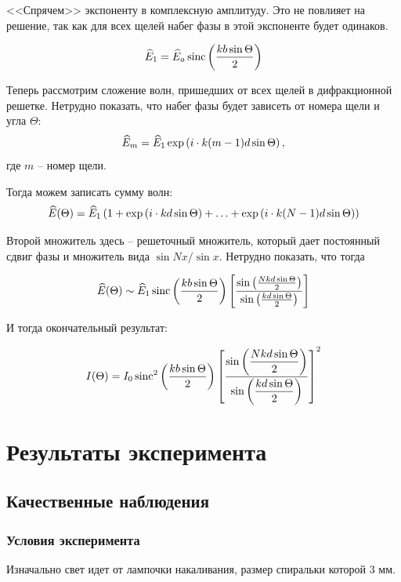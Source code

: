 <<Спрячем>> экспоненту в комплексную амплитуду. Это не повлияет на решение, так как для всех щелей набег фазы в этой экспоненте будет одинаков.

\begin{equation}
	\widehat{E}_{1}=\widehat{E}_{a}\operatorname{sinc}\left(\frac{k b \sin\Theta}{2}\right)
\end{equation}

Теперь рассмотрим сложение волн, пришедших от всех щелей в дифракционной решетке. Нетрудно показать, что набег фазы будет зависеть от номера щели и угла $\Theta$:
\begin{equation}
	\widehat{E}_m=\widehat{E}_{1}\exp\left(i\cdot k (m-1)d\sin\Theta\right),
\end{equation}
где $m$ -- номер щели.

Тогда можем записать сумму волн:
\begin{equation}
	\widehat{E}(\Theta)=\widehat{E}_1 \left(
		1+\exp\left(i\cdot kd\sin\Theta\right)+\ldots+\exp\left(i\cdot k (N-1)d\sin\Theta\right)
	\right)
\end{equation}

Второй множитель здесь -- решеточный множитель, который дает постоянный сдвиг фазы и множитель вида $\sin  Nx / \sin x$. Нетрудно показать, что тогда

\begin{equation}
	\widehat{E}(\Theta) \sim \widehat{E}_1 \operatorname{sinc}\left(\frac{k b \sin\Theta}{2}\right)
	\left[
		\frac{\sin\left(\frac{Nk d \sin\Theta}{2}\right)}{\sin\left(\frac{k d \sin\Theta}{2}\right)}
	\right]
\end{equation}

И тогда окончательный результат:

\begin{equation}
	\label{eq:intensity}
	I(\Theta) = I_0 \operatorname{sinc}^2\left(\frac{k b \sin\Theta}{2}\right)
	\left[
		\frac{\displaystyle\sin\left(\frac{Nk d \sin\Theta}{2}\right)}{\displaystyle\sin\left(\frac{k d \sin\Theta}{2}\right)}
	\right]^2
\end{equation}

\newpage
\section{Результаты эксперимента}

\subsection{Качественные наблюдения}
\subsubsection{Условия эксперимента}
Изначально свет идет от лампочки накаливания, размер спиральки которой 3 мм.

